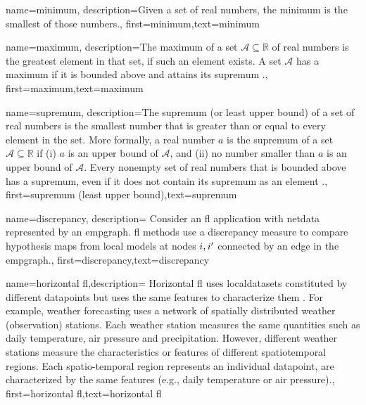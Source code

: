 
{
	name=minimum,
	description={Given a set of real numbers, the minimum is the smallest of those numbers.},
	first={minimum},text={minimum}
}


{name=maximum,
     description={The maximum of a set $\mathcal{A} \subseteq \mathbb{R}$ 
     	of real numbers is the greatest element in that set, if such an element exists. A set $\mathcal{A}$ 
     	has a maximum if it is bounded above and attains its \gls{supremum} \cite[Sec.~1.4, pp.~11--13]{RudinBookPrinciplesMatheAnalysis}.},
 first={maximum},text={maximum}
}

{name=supremum,
	description={The supremum (or least upper bound) of a set of real numbers is 
		the smallest number that is greater than or equal to every element in the set. More formally, a 
		real number $a$ is the supremum of a set $\mathcal{A} \subseteq \mathbb{R}$ if (i) $a$ 
		is an upper bound of $\mathcal{A}$, and (ii) no number smaller than $a$ is an upper bound of $\mathcal{A}$. 
		Every nonempty set of real numbers that is bounded above has a supremum, even if it does 
		not contain its supremum as an element \cite[Sec.~1.4, pp.~11--13]{RudinBookPrinciplesMatheAnalysis}.},
	first={supremum (least upper bound)},text={supremum}
}

{name=discrepancy,
	description={
		Consider an \gls{fl} application with \gls{netdata} 
		represented by an \gls{empgraph}. \gls{fl} methods use a discrepancy measure 
		to compare \gls{hypothesis} maps from local models at nodes $i,i'$ 
		connected by an edge in the \gls{empgraph}.},
	first={discrepancy},text={discrepancy}
}



{name={horizontal \gls{fl}},description=
	{Horizontal \gls{fl} uses \gls{localdataset}s constituted by different
	   \gls{datapoint}s but uses the same \gls{feature}s to characterize them \cite{HFLChapter2020}.
		For example, weather forecasting uses a network of spatially distributed
		weather (observation) stations. Each weather station measures the
		same quantities such as daily temperature, air pressure and precipitation.
		However, different weather stations measure the characteristics or
		\gls{feature}s of different spatiotemporal regions. Each spatio-temporal region 
		represents an individual \gls{datapoint}, are characterized by the same \gls{feature}s 
		(e.g., daily temperature or air pressure).},
	first={horizontal \gls{fl}},text={horizontal \gls{fl}}
} 

